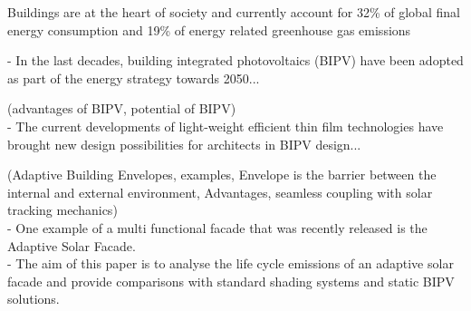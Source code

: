 
Buildings are at the heart of society and currently account for 32\% of global final energy consumption and 19\% of energy related greenhouse gas emissions \cite{IPCC}

- In the last decades, building integrated photovoltaics (BIPV) have been adopted as part of the energy strategy towards 2050... \

(advantages of BIPV, potential of BIPV)\\

- The current developments of light-weight efficient thin film technologies have brought new design possibilities for architects in BIPV design... \

(Adaptive Building Envelopes, examples, Envelope is the barrier between the internal and external environment, Advantages, seamless coupling with solar tracking mechanics) \\

- One example of a multi functional facade that was recently released is the Adaptive Solar Facade.\\

- The aim of this paper is to analyse the life cycle emissions of an adaptive solar facade and provide comparisons with standard shading systems and static BIPV solutions.\\
